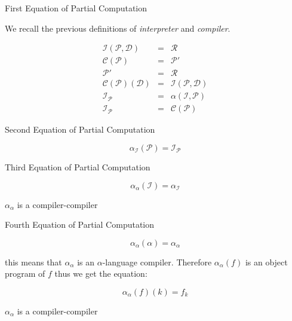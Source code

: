 \documentclass[aspectratio=169]{beamer}
\renewcommand{\P}{\ensuremath{\mathcal{P}}\xspace}
\newcommand{\C}{\ensuremath{\mathcal{C}}\xspace}
\newcommand{\R}{\ensuremath{\mathcal{R}}\xspace}
\begin{document}
\begin{frame}{First Equation of Partial Computation}

    

We recall the previous definitions of \textit{interpreter}
and \textit{compiler}.

\begin{eqnarray*}
    \mathcal{I}(\mathcal{P}, \mathcal{D}) &=& \R \\
    \C(\P)&=&\P'\\
    \P' &=& \R \\
    \mathcal{C}(\mathcal{P})(\mathcal{D}) &=& \mathcal{I}(\mathcal{P},\mathcal{D})\\
    \mathcal{I}_{\mathcal{P}} &=&  \alpha(\mathcal{I},\mathcal{P}) \\ 
    \mathcal{I}_{\mathcal{P}} &=&  \mathcal{C}(\mathcal{P})
\end{eqnarray*}


\end{frame}


\begin{frame}{Second Equation of Partial Computation}

    
    \begin{equation}
    \alpha_\mathcal{I}(\mathcal{P}) =  \mathcal{I}_\mathcal{P}
    \end{equation}
    
    
\end{frame}

\begin{frame}{Third Equation of Partial Computation}

    
    \begin{equation}
    \alpha_\alpha(\mathcal{I}) =  \alpha_\mathcal{I}
    \end{equation}
    
    $\alpha_\alpha$ is a compiler-compiler
    
\end{frame}


\begin{frame}{Fourth Equation of Partial Computation}

    \[
        \alpha_\alpha(\alpha)=\alpha_\alpha    
    \]

    this means that $\alpha_\alpha$ is an $\alpha$-language compiler.
    Therefore $\alpha_\alpha(f)$ is an object program of $f$
    thus we get the equation: 
    
    \begin{equation}
    \alpha_\alpha(f)(k) =  f_k
    \end{equation}
    
    $\alpha_\alpha$ is a compiler-compiler
    
\end{frame}
     
\end{document}
